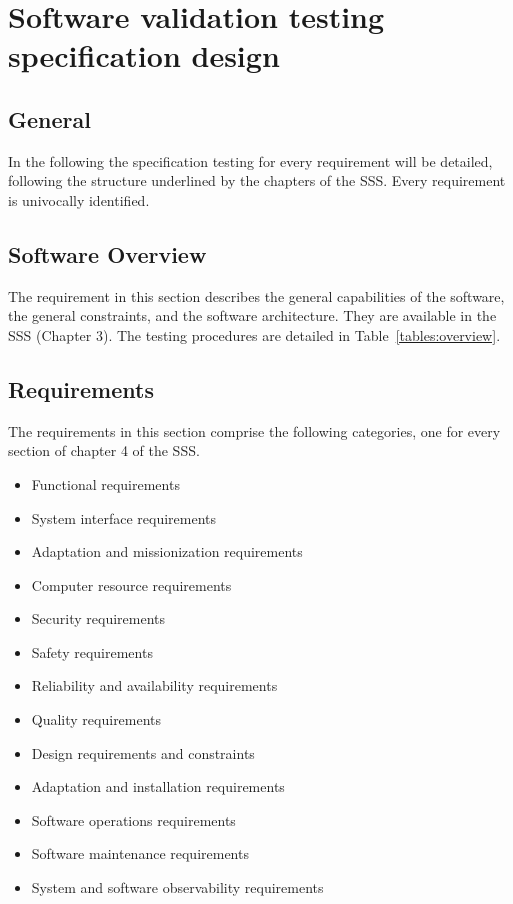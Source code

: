 \chapter{Software validation testing specification design}

\section{General}

In the following the specification testing for every requirement will be detailed, following the structure underlined by the chapters of the SSS.
Every requirement is univocally identified.

\section{Software Overview}
The requirement in this section describes the general capabilities of the software, the general constraints, and the software architecture.
They are available in the SSS (Chapter 3).
The testing procedures are detailed in Table~\ref{tables:overview}.



\section{Requirements}

The requirements in this section comprise the following categories, one for every section of chapter 4 of the SSS.

\begin{itemize}
  \item Functional requirements
  \item System interface requirements
  \item Adaptation and missionization requirements
  \item Computer resource requirements
  \item Security requirements
  \item Safety requirements
  \item Reliability and availability requirements
  \item Quality requirements
  \item Design requirements and constraints
  \item Adaptation and installation requirements
  \item Software operations requirements
  \item Software maintenance requirements
  \item System and software observability requirements
\end{itemize}

